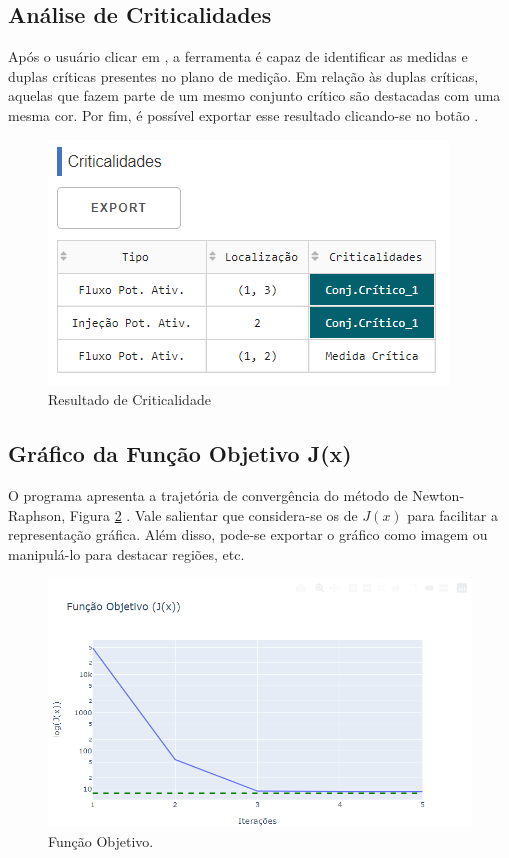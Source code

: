 \documentclass{article}
\begin{document}
\subsection{Análise de Criticalidades}
Após o usuário clicar em , a ferramenta é capaz de identificar as medidas e duplas críticas presentes no plano de medição. Em relação às duplas críticas, aquelas que fazem parte de um mesmo conjunto crítico são destacadas com uma mesma cor. Por fim, é possível exportar esse resultado clicando-se no botão .

\begin{figure}[H]
    \centering
    \includegraphics[scale = .65]{Imagens/Criticalidades_Ferrameta.PNG}
    \caption{Resultado de Criticalidade}
    \label{fig:my_label}
\end{figure}


\subsection{Gráfico da Função Objetivo J(x)}
O programa apresenta a trajetória de convergência do método de Newton-Raphson, Figura \ref{fig:fobj} . Vale salientar que considera-se os  de $J(x)$ para facilitar a representação gráfica. Além disso, pode-se exportar o gráfico como imagem ou manipulá-lo para destacar regiões, etc.

\begin{figure}[H]
    \centering
    \includegraphics[scale=.65]{Imagens/Função_Objetivo_Ferramenta.PNG}
    \caption{Função Objetivo.}
    \label{fig:fobj}
\end{figure}
\end{document}
